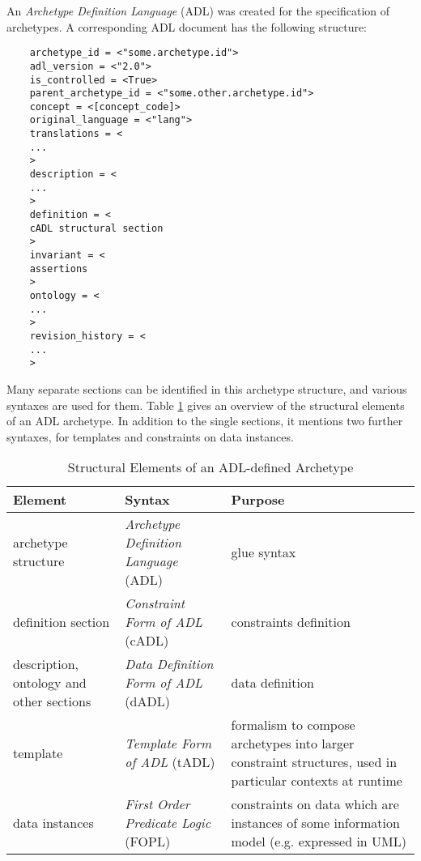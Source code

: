An \emph{Archetype Definition Language} (ADL) \cite{adl} was created for the
specification of archetypes. A corresponding ADL document has the following
structure:

\begin{scriptsize}
    \begin{verbatim}
    archetype_id = <"some.archetype.id">
    adl_version = <"2.0">
    is_controlled = <True>
    parent_archetype_id = <"some.other.archetype.id">
    concept = <[concept_code]>
    original_language = <"lang">
    translations = <
    ...
    >
    description = <
    ...
    >
    definition = <
    cADL structural section
    >
    invariant = <
    assertions
    >
    ontology = <
    ...
    >
    revision_history = <
    ...
    >
    \end{verbatim}
\end{scriptsize}

Many separate sections can be identified in this archetype structure, and
various syntaxes are used for them. Table \ref{adl_table} gives an overview of
the structural elements of an ADL archetype. In addition to the single
sections, it mentions two further syntaxes, for templates and constraints on
data instances.

\begin{table}[ht]
    \begin{center}
        \begin{footnotesize}
        \begin{tabular}{| p{30mm} | p{30mm} | p{45mm} |}
            \hline
            \textbf{Element} & \textbf{Syntax} & \textbf{Purpose}\\
            \hline
            archetype structure & \emph{Archetype Definition Language} (ADL) & glue syntax\\
            \hline
            definition section & \emph{Constraint Form of ADL} (cADL) &
                constraints definition\\
            \hline
            description, ontology and other sections & \emph{Data Definition Form of ADL} (dADL) &
                data definition\\
            \hline
            template & \emph{Template Form of ADL} (tADL) &
                formalism to compose archetypes into larger constraint structures, used in particular contexts at runtime\\
            \hline
            data instances & \emph{First Order Predicate Logic} (FOPL) &
                constraints on data which are instances of some information model (e.g. expressed in UML)\\
            \hline
        \end{tabular}
        \end{footnotesize}
        \caption{Structural Elements of an ADL-defined Archetype \cite{adl}}
        \label{adl_table}
    \end{center}
\end{table}

